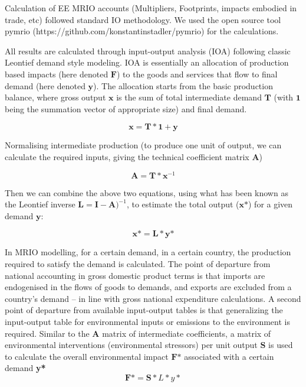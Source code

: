 Calculation of EE MRIO accounts (Multipliers, Footprints, impacts embodied in trade, etc) followed
standard IO methodology. We used the open source tool pymrio (https://github.com/konstantinstadler/pymrio) for the calculations.

All results are  calculated through input-output analysis (IOA) following classic Leontief demand style modeling. IOA is essentially an allocation of production based impacts (here denoted $\textbf{F}$) to the goods and services that flow to final demand (here denoted $\textbf{y}$). The allocation starts from the basic production balance, where gross output $\textbf{x}$ is the sum of total intermediate demand $\textbf{T}$ (with $\textbf{1}$ being the summation vector of appropriate size) and final demand. 

\begin{equation}
\textbf{x}=\textbf{T}*\textbf{1}+\textbf{y}
\end{equation}

Normalising intermediate production (to produce one unit of output, we can calculate the required inputs, giving the technical coefficient matrix $\textbf{A}$)

\begin{equation}
\textbf{A}=\textbf{T} * \textbf{x}^{-1}
\end{equation}

Then we can combine the above two equations, using what has been known as the Leontief inverse $\textbf{L} = \textbf{I}-\textbf{A})^{-1}$, to estimate the total output ($\textbf{x*}$) for a given demand $\textbf{y}$:

\begin{equation}
\textbf{x*}=\textbf{L} * \textbf{y*}
\end{equation}

In MRIO modelling, for a certain demand, in a certain country, the production required to satisfy the demand is calculated. The point of departure from national accounting in gross domestic product terms is that imports are endogenised in the flows of goods to demands, and exports are excluded from a country’s demand – in line with gross national expenditure calculations. A second point of departure from available input-output tables is that generalizing the input-output table for environmental inputs or emissions to the environment is required. Similar to the $\textbf{A}$ matrix of intermediate coefficients, a matrix of environmental interventions (environmental stressors) per unit output $\textbf{S}$ is used to calculate the overall environmental impact $\textbf{F*}$ associated with a certain demand \textbf{y*} 
\begin{equation}
\textbf{F*} = \textbf{S} * L * y*
\end{equation}
